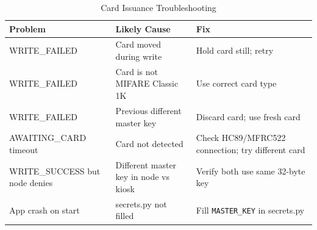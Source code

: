 \begin{table}[H]
\centering
\caption{Card Issuance Troubleshooting}
\begin{tabular}{L{4cm}L{5cm}L{5.5cm}}
\toprule
\textbf{Problem} & \textbf{Likely Cause} & \textbf{Fix} \\
\midrule
WRITE\_FAILED & Card moved during write & Hold card still; retry \\
WRITE\_FAILED & Card is not MIFARE Classic 1K & Use correct card type \\
WRITE\_FAILED & Previous different master key & Discard card; use fresh card \\
AWAITING\_CARD timeout & Card not detected & Check HC89/MFRC522 connection; try different card \\
WRITE\_SUCCESS but node denies & Different master key in node vs kiosk & Verify both use same 32-byte key \\
App crash on start & secrets.py not filled & Fill \texttt{MASTER\_KEY} in secrets.py \\
\bottomrule
\end{tabular}
\end{table}
